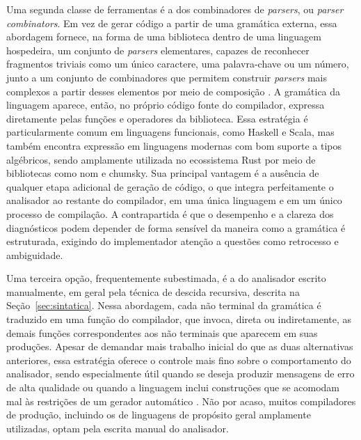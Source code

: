 \documentclass[
    12pt
    ,oneside
    ,a4paper
    ,chapter=TITLE
    ,section=TITLE
    ,sumario=abnt-6027-2012]{abntex2}
\begin{document}
Uma segunda classe de ferramentas é a dos combinadores de \textit{parsers}, ou
\textit{parser combinators}. Em vez de gerar código a partir de uma gramática externa, essa
abordagem fornece, na forma de uma biblioteca dentro de uma linguagem hospedeira, um conjunto
de \textit{parsers} elementares, capazes de reconhecer fragmentos triviais como um único
caractere, uma palavra-chave ou um número, junto a um conjunto de combinadores que permitem
construir \textit{parsers} mais complexos a partir desses elementos por meio de composição
\cite{fowler2010}. A gramática da linguagem aparece, então, no próprio código fonte do
compilador, expressa diretamente pelas funções e operadores da biblioteca. Essa estratégia é
particularmente comum em linguagens funcionais, como Haskell e Scala, mas também encontra
expressão em linguagens modernas com bom suporte a tipos algébricos, sendo amplamente utilizada
no ecossistema Rust por meio de bibliotecas como nom e chumsky. Sua principal vantagem é a
ausência de qualquer etapa adicional de geração de código, o que integra perfeitamente o
analisador ao restante do compilador, em uma única linguagem e em um único processo de
compilação. A contrapartida é que o desempenho e a clareza dos diagnósticos podem depender de
forma sensível da maneira como a gramática é estruturada, exigindo do implementador atenção a
questões como retrocesso e ambiguidade.

Uma terceira opção, frequentemente subestimada, é a do analisador escrito manualmente,
em geral pela técnica de descida recursiva, descrita na Seção~\ref{sec:sintatica}. Nessa
abordagem, cada não terminal da gramática é traduzido em uma função do compilador, que invoca,
direta ou indiretamente, as demais funções correspondentes aos não terminais que aparecem em
suas produções. Apesar de demandar mais trabalho inicial do que as duas alternativas anteriores,
essa estratégia oferece o controle mais fino sobre o comportamento do analisador, sendo
especialmente útil quando se deseja produzir mensagens de erro de alta qualidade ou quando a
linguagem inclui construções que se acomodam mal às restrições de um gerador automático
\cite{fowler2010}. Não por acaso, muitos compiladores de produção, incluindo os de linguagens
de propósito geral amplamente utilizadas, optam pela escrita manual do analisador.
\end{document}
